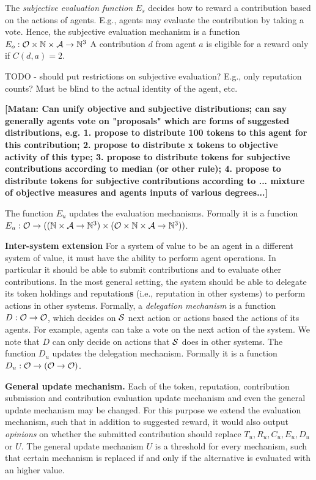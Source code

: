 \documentclass[10pt]{llncs}
\newcommand{\nat}{\mathbb{N}}
\newcommand{\MyComment}[1]{{\textbf{\color{blue} [Matan: #1]}}}
\begin{document}
The \emph{subjective evaluation function} $E_s$ decides how to reward a contribution based on the actions of agents.
E.g., agents may evaluate the contribution by taking a vote.
Hence, the subjective evaluation mechanism is a function 
$E_o : \AgentOperations \times \nat \times \Agents \to \nat^3$
A contribution $d$ from agent $a$ is eligible for a reward only if $C(d,a)=2$.

TODO - should put restrictions on subjective evaluation? E.g., only reputation counts? Must be blind to the actual identity of the agent, etc.

\MyComment{Can unify objective and subjective distributions; can say generally agents vote on "proposals" which are forms of suggested distributions, e.g. 1. propose to distribute 100 tokens to this agent for this contribution; 2. propose to distribute x tokens to objective activity of this type; 3. propose to distribute tokens for subjective contributions according to median (or other rule); 4. propose to distribute tokens for subjective contributions according to ... mixture of objective measures and agents inputs of various degrees...}

The function $E_u$ updates the evaluation mechanisms.
Formally it is a function $E_u : \AgentOperations \to ((\nat \times \Agents \to \nat^3)\times(\AgentOperations \times \nat \times \Agents \to \nat^3))$.


\noindent \textbf{Inter-system extension}
For a system of value to be an agent in a different system of value, it must have the ability to perform agent operations.
In particular it should be able to submit contributions and to evaluate other contributions.
In the most general setting, the system should be able to delegate its token holdings and reputation\textbf{s} (i.e., reputation in other systems) to perform actions in other systems.
Formally, a \emph{delegation mechanism} is a function $D:\mathcal{O}\to \mathcal{O}$, which decides on $\mathcal{S}$ next action or actions based the actions of its agents.
For example, agents can take a vote on the next action of the system.
We note that $D$ can only decide on actions that $\mathcal{S}$ does in other systems.
The function $D_u$ updates the delegation mechanism.
Formally it is a function $D_u : \mathcal{O}\to (\mathcal{O} \to \mathcal{O})$.

\noindent \textbf{General update mechanism.}
Each of the token, reputation, contribution submission and contribution evaluation update mechanism and even the general update mechanism may be changed.
For this purpose we extend the evaluation mechanism, such that in addition to suggested reward, it would also output \emph{opinions} on whether the submitted contribution should replace $T_u, R_u, C_u, E_u, D_u$ or $U$.
The general update mechanism $U$ is a threshold for every mechanism, such that certain mechanism is replaced if and only if the alternative is evaluated with an higher value.
\end{document}
